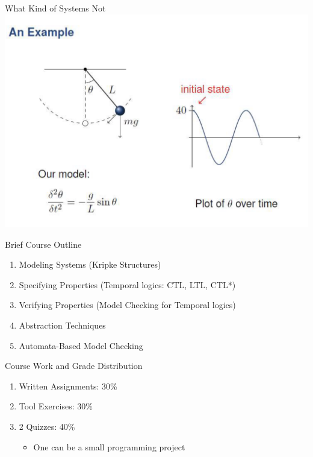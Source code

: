 \documentclass{beamer}
\begin{document}
\begin{frame}{What Kind of Systems Not}
\includegraphics[scale=0.3]{pics/contdynamics.png}
\end{frame}

\begin{frame}{Brief Course Outline}
\begin{enumerate}
\item Modeling Systems (Kripke Structures)
\item Specifying Properties (Temporal logics: CTL, LTL, CTL*)
\item Verifying Properties (Model Checking for Temporal logics)
\item Abstraction Techniques
\item Automata-Based Model Checking
\end{enumerate}
\end{frame}

\begin{frame}{Course Work and Grade Distribution}
\begin{enumerate}
\item  Written Assignments: 30\%

\item  Tool Exercises: 30\%

\item  2 Quizzes: 40\%
\begin{itemize}
\item One can be a small programming project
\end{itemize}
\end{enumerate}
\end{frame}
\end{document}
